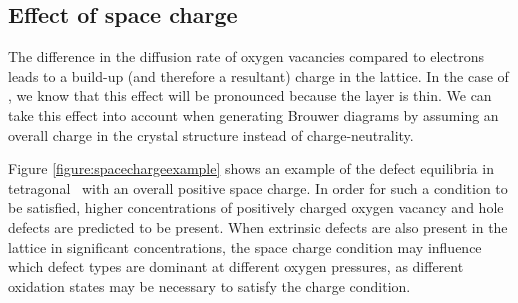 \subsection{Effect of space charge}

The difference in the diffusion rate of oxygen vacancies compared to electrons leads to a build-up (and therefore a resultant) charge in the lattice. In the case of \zirconia , we know that this effect will be pronounced because the layer is thin. We can take this effect into account when generating Brouwer diagrams by assuming an overall charge in the crystal structure instead of charge-neutrality. 

Figure \ref{figure:spacechargeexample} shows an example of the defect equilibria in tetragonal \zirconia\ with an overall positive space charge. In order for such a condition to be satisfied, higher concentrations of positively charged oxygen vacancy and hole defects are predicted to be present. When extrinsic defects are also present in the lattice in significant concentrations, the space charge condition may influence which defect types are dominant at different oxygen pressures, as different oxidation states may be necessary to satisfy the charge condition.


